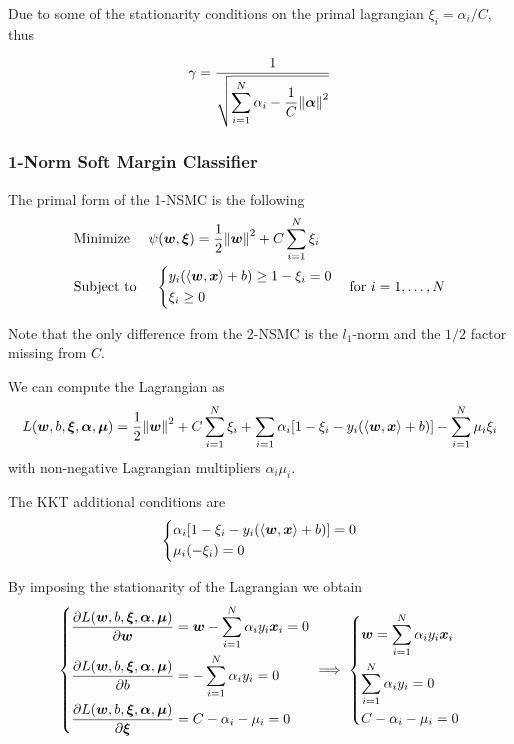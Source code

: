 \documentclass[oneside,onecolumn]{report}
\newcommand{\inp}[2]{\left\langle #1, #2 \right\rangle}
\begin{document}
Due to some of the stationarity conditions on the primal lagrangian $\xi_i = \alpha_i/C$, thus

$$ \gamma = \frac{1}{\displaystyle \sqrt{\sum_{i = 1}^N \alpha_i - \frac{1}{C} \norm{\bm \alpha}^2}} $$


\subsubsection{1-Norm Soft Margin Classifier}
The primal form of the 1-NSMC is the following
\begin{align*}
    &\text{Minimize   } \quad \psi(\bm w, \bm \xi) = \frac{1}{2} \norm{\bm w}^2 + C \sum_{i = 1}^N \xi_i \\
    &\text{Subject to } \quad \begin{dcases}
    y_i (\inp{\bm w}{\bm x} + b) \geq 1 - \xi_i = 0 \\
    \xi_i \geq 0
\end{dcases} \quad \text{for } i = 1, \dots, N
\end{align*}

Note that the only difference from the 2-NSMC is the $l_1$-norm and the $1/2$ factor missing from $C$.

We can compute the Lagrangian as
$$ L(\bm w, b, \bm \xi, \bm \alpha, \bm \mu) = \frac{1}{2} \norm{\bm w}^2 + C \sum_{i = 1}^N \xi_i + \sum_{i = 1} \alpha_i [1 - \xi_i  - y_i (\inp{\bm w}{\bm x} + b)] - \sum_{i = 1}^N \mu_i \xi_i $$
with non-negative Lagrangian multipliers $\alpha_i \mu_i$.

The KKT additional conditions are
$$ \begin{dcases}
    \alpha_i [1 - \xi_i  - y_i (\inp{\bm w}{\bm x} + b)] = 0 \\
    \mu_i (-\xi_i) = 0
\end{dcases} $$

By imposing the stationarity of the Lagrangian we obtain
$$ \begin{dcases}
    \pdv{L(\bm w, b, \bm \xi, \bm \alpha, \bm \mu)}{\bm w} = \bm w - \sum_{i = 1}^N \alpha_i y_i \bm x_i = 0 \\
    \pdv{L(\bm w, b, \bm \xi, \bm \alpha, \bm \mu)}{b} = - \sum_{i = 1}^N \alpha_i y_i = 0 \\
    \pdv{L(\bm w, b, \bm \xi, \bm \alpha, \bm \mu)}{\bm \xi} = C - \alpha_i - \mu_i = 0
\end{dcases} \implies
\begin{dcases}
    \bm w = \sum_{i = 1}^N \alpha_i y_i \bm x_i \\
    \sum_{i = 1}^N \alpha_i y_i = 0 \\
    C - \alpha_i - \mu_i = 0
\end{dcases} $$
\end{document}
